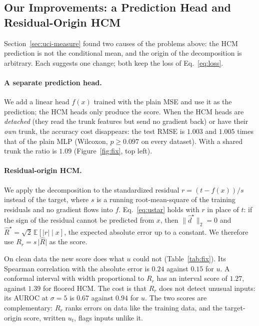 \subsection{Our Improvements: a Prediction Head and Residual-Origin HCM}
\label{sec:uci-fix}

Section~\ref{sec:uci-measure} found two causes of the problems above: the HCM prediction is
not the conditional mean, and the origin of the decomposition is arbitrary. Each suggests
one change; both keep the loss of Eq.~\eqref{eq:loss}.

\paragraph{A separate prediction head.} We add a linear head $f(x)$ trained with the plain
MSE and use it as the prediction; the HCM heads only produce the score. When the HCM heads
are \emph{detached} (they read the trunk features but send no gradient back) or have their
\emph{own} trunk, the accuracy cost disappears: the test RMSE is $1.003$ and $1.005$ times
that of the plain MLP (Wilcoxon, $p\ge 0.097$ on every dataset). With a shared trunk the
ratio is $1.09$ (Figure~\ref{fig:fix}, top left).

\paragraph{Residual-origin HCM.} We apply the decomposition to the standardized residual
$r=(t-f(x))/s$ instead of the target, where $s$ is a running root-mean-square of the
training residuals and no gradient flows into $f$. Eq.~\eqref{eq:ustar} holds with $r$ in place of $t$: if the sign of the residual
cannot be predicted from $x$, then $\lVert\hat d^\star\rVert_2=0$ and
$\hat R^\star=\sqrt2\,\mathbb{E}[\lvert r\rvert\mid x]$, the expected absolute error up to a
constant. We therefore use $R_r=s\,\lvert\hat R\rvert$ as the score.

On clean data the new score does what $u$ could not (Table~\ref{tab:fix}). Its Spearman
correlation with the absolute error is $0.24$ against $0.15$ for $u$. A conformal interval
with width proportional to $R_r$ has an interval score of $1.27$, against $1.39$ for
floored HCM. The cost is that $R_r$ does not
detect unusual inputs: its AUROC at $\sigma=5$ is $0.67$ against $0.94$ for $u$. The two
scores are complementary: $R_r$ ranks errors on data like the training data, and the
target-origin score, written $u_t$, flags inputs unlike it.

